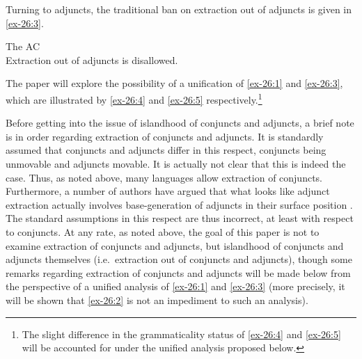 \documentclass[output=paper]{langsci/langscibook}
\begin{document}
Turning to adjuncts, the traditional ban on extraction out of adjuncts is given
in \eqref{ex-26:3}.

\ea\label{ex-26:3}The \gls{AC}\\
	Extraction out of adjuncts is disallowed.
\z

The paper will explore the possibility of a unification of \eqref{ex-26:1} and \eqref{ex-26:3}, which
are illustrated by \eqref{ex-26:4} and \eqref{ex-26:5} respectively.\footnote{The slight difference in
the grammaticality status of \eqref{ex-26:4} and \eqref{ex-26:5} will be accounted for under the
unified analysis proposed below.}

\begin{exe}
%
    \label{ex-26:4}
%
    \label{ex-26:5}
\end{exe}

Before getting into the issue of islandhood of conjuncts and adjuncts, a brief
note is in order regarding extraction of conjuncts and adjuncts. It is
standardly assumed that conjuncts and adjuncts differ in this respect,
conjuncts being unmovable and adjuncts movable. It is actually not clear that
this is indeed the case. Thus, as noted above, many languages allow extraction
of conjuncts. Furthermore, a number of authors have argued that what looks like
adjunct extraction actually involves base-generation of adjuncts in their
surface position \parencite[e.g.][]{Uriagereka1988,Law1993,Stepanov2001a}. The
standard assumptions in this respect are thus incorrect, at least with respect
to conjuncts. At any rate, as noted above, the goal of this paper is not to
examine extraction of conjuncts and adjuncts, but islandhood of conjuncts and
adjuncts themselves (i.e.\ extraction out of conjuncts and adjuncts), though
some remarks regarding extraction of conjuncts and adjuncts will be made below
from the perspective of a unified analysis of \eqref{ex-26:1} and \eqref{ex-26:3} (more precisely, it
will be shown that \eqref{ex-26:2} is not an impediment to such an analysis).
\end{document}
